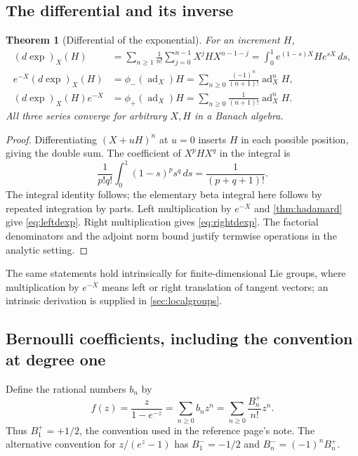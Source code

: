 \documentclass[11pt]{article}
\numberwithin{equation}{section}
\newtheorem{theorem}{Theorem}[section]
\theoremstyle{definition}
\theoremstyle{remark}
\DeclareMathOperator{\ad}{ad}
\begin{document}
\subsection{The differential and its inverse}
\begin{theorem}[Differential of the exponential]\label{thm:dexp}
For an increment $H$,
\begin{align}
 (d\exp)_X(H)
 &=\sum_{n\geq1}\frac1{n!}\sum_{j=0}^{n-1}X^jHX^{n-1-j}
   =\int_0^1 e^{(1-s)X}He^{sX}\,ds,\label{eq:dexpintegral}\\
 e^{-X}(d\exp)_X(H)
 &=\phi_-(\ad_X)H
   =\sum_{n\geq0}\frac{(-1)^n}{(n+1)!}\ad_X^nH,\label{eq:leftdexp}\\
 (d\exp)_X(H)e^{-X}
 &=\phi_+(\ad_X)H
   =\sum_{n\geq0}\frac1{(n+1)!}\ad_X^nH.\label{eq:rightdexp}
\end{align}
All three series converge for arbitrary $X,H$ in a Banach algebra.
\end{theorem}
\begin{proof}
Differentiating $(X+uH)^n$ at $u=0$ inserts $H$ in each possible
position, giving the double sum. The coefficient of $X^pHX^q$ in the
integral is
\[
 \frac1{p!q!}\int_0^1(1-s)^p s^q\,ds=\frac1{(p+q+1)!}.
\]
The integral identity follows; the elementary beta integral here follows
by repeated integration by parts. Left multiplication by $e^{-X}$ and
\cref{thm:hadamard} give \eqref{eq:leftdexp}. Right multiplication gives
\eqref{eq:rightdexp}. The factorial denominators and the adjoint norm
bound justify termwise operations in the analytic setting.
\end{proof}
The same statements hold intrinsically for finite-dimensional Lie
groups, where multiplication by $e^{-X}$ means left or right translation
of tangent vectors; an intrinsic derivation is supplied in
\cref{sec:localgroups}.

\subsection{Bernoulli coefficients, including the convention at degree one}
Define the rational numbers $b_n$ by
\begin{equation}\label{eq:bernoulligen}
 f(z)=\frac{z}{1-e^{-z}}=\sum_{n\geq0}b_nz^n
 =\sum_{n\geq0}\frac{B_n^+}{n!}z^n.
\end{equation}
Thus $B_1^+=+1/2$, the convention used in the reference page's note.
The alternative convention for $z/(e^z-1)$ has $B_1^-=-1/2$ and
$B_n^-=(-1)^nB_n^+$.
\end{document}
